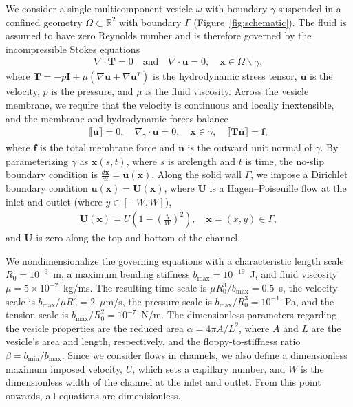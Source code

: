 \documentclass[twoside,twocolumn,9pt]{article}
\newcommand{\ff}{\mathbf{f}}
\newcommand{\nn}{\mathbf{n}}
\newcommand{\RR}{\mathbb{R}}
\newcommand{\uu}{\mathbf{u}}
\newcommand{\TT}{\mathbf{T}}
\newcommand{\UU}{\mathbf{U}}
\newcommand{\xx}{\mathbf{x}}
\begin{document}
We consider a single multicomponent vesicle $\omega$ with boundary
$\gamma$ suspended in a confined geometry $\Omega \subset \RR ^2$ with
boundary $\Gamma$ (Figure~\ref{fig:schematic}). The fluid is assumed to
have zero Reynolds number and is therefore governed by the
incompressible Stokes equations
\begin{align}
    \nabla \cdot \TT = 0 \quad \text{and} \quad \nabla \cdot \uu = 0, 
        \quad \xx \in \Omega \backslash \gamma,
\end{align}
where $\TT = -p\mathbf{I} + \mu\left(\nabla \uu + \nabla \uu^T \right)$
is the hydrodynamic stress tensor, $\uu$ is the velocity, $p$ is the
pressure, and $\mu$ is the fluid viscosity. Across the vesicle membrane,
we require that the velocity is continuous and locally inextensible, and
the membrane and hydrodynamic forces balance
\begin{align}
  \llbracket \uu \rrbracket = 0, \quad 
  \nabla_{\gamma} \cdot \uu = 0, \quad \xx \in \gamma, \quad
  \llbracket \TT\nn \rrbracket = \ff, 
\end{align}
where $\ff$ is the total membrane force and $\nn$ is the outward unit
normal of $\gamma$. By parameterizing $\gamma$ as $\xx(s,t)$, where $s$
is arclength and $t$ is time, the no-slip boundary condition is
$\frac{d\xx}{dt} = \uu(\xx)$.  Along the solid wall $\Gamma$, we impose
a Dirichlet boundary condition $\uu(\xx) = \UU(\xx)$, where $\UU$ is a
Hagen–Poiseuille flow at the inlet and outlet (where $y\in[-W,W]$),
\begin{align}
  \UU(\xx) = U \left(1 - \left(\frac{y}{W}\right)^2 \right), 
    \quad \xx = (x,y) \in \Gamma,
\end{align}
and $\UU$ is zero along the top and bottom of the channel.

We nondimensionalize the governing equations with a characteristic
length scale $R_0 = 10^{-6}$~m, a maximum bending stiffness $b_{\max} =
10^{-19}$~J, and fluid viscosity $\mu = 5 \times 10^{-2}$~kg/ms. The
resulting time scale is $\mu R_0^3/b_{\max} = 0.5$~s, the velocity scale
is $b_{\max}/\mu R_0^2=2$~$\mu$m/s, the pressure scale is
$b_{\max}/R_0^3 = 10^{-1}$~Pa, and the tension scale is $b_{\max}/R_0^2
= 10^{-7}$~N/m. The dimensionless parameters regarding the vesicle
properties are the reduced area $\alpha = 4\pi A/L^2$, where $A$ and $L$
are the vesicle's area and length, respectively, and the
floppy-to-stiffness ratio $\beta = b_{\min}/b_{\max}$. Since we consider
flows in channels, we also define a dimensionless maximum imposed
velocity, $U$, which sets a capillary number, and $W$ is the
dimensionless width of the channel at the inlet and outlet. From this
point onwards, all equations are dimenisionless.
\end{document}
